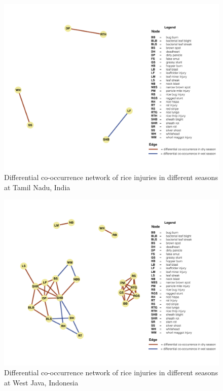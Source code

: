 \begin{figure}
\centering
\includegraphics[width = 1\textwidth]{figures/difseasonTM.pdf}
\caption{Differential co-occurrence network of rice injuries in different seasons at Tamil Nadu, India}
\label{fig:difseasonTM}
\end{figure}


\begin{figure}
\centering
\includegraphics[width = 1\textwidth]{figures/difseasonWJ.pdf}
\caption{Differential co-occurrence network of rice injuries in different seasons at West Java, Indonesia}
\label{fig:difseasonWJ}
\end{figure}

